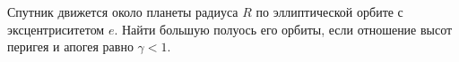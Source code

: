 Спутник движется около планеты радиуса $R$
по эллиптической орбите с эксцентриситетом $e$.
Найти большую полуось его орбиты,
если отношение высот перигея и апогея равно $\gamma < 1$.
